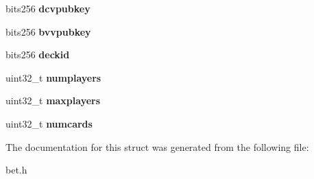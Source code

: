 \begin{DoxyCompactItemize}
bits256 {\bfseries dcvpubkey}
\item 
\mbox{\label{structdeck__player__info_ada2129496132e81e7a4ca7ec2586226e}} 
bits256 {\bfseries bvvpubkey}
\item 
\mbox{\label{structdeck__player__info_aa88dd303072d38aa72f735ea385fbbc6}} 
bits256 {\bfseries deckid}
\item 
\mbox{\label{structdeck__player__info_a07a5c22a6eb96173dd6cbd0262ad6968}} 
uint32\+\_\+t {\bfseries numplayers}
\item 
\mbox{\label{structdeck__player__info_a28099f450784fc67babc668315a61318}} 
uint32\+\_\+t {\bfseries maxplayers}
\item 
\mbox{\label{structdeck__player__info_a1f07b1a6921a7a2c1055a47ff6dc8ae0}} 
uint32\+\_\+t {\bfseries numcards}
\end{DoxyCompactItemize}


The documentation for this struct was generated from the following file\+:\begin{DoxyCompactItemize}
\item 
bet.\+h\end{DoxyCompactItemize}
